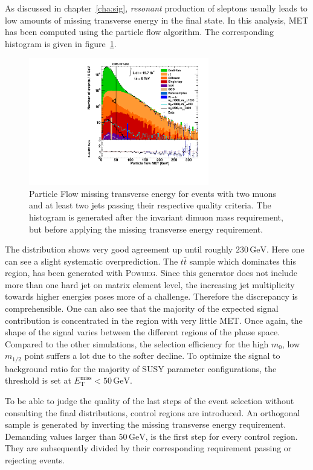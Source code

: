 As discussed in chapter~\ref{cha:sig}, \textit{resonant} production of sleptons usually leads to low amounts of missing transverse energy in the final state. In this analysis, MET has been computed using the particle flow algorithm. The corresponding histogram is given in figure~\ref{fig:pfmet}.

\begin{figure}[ht!]
  \centering
    \includegraphics[width=0.7\textwidth]{plots/apfmet.pdf}
  \caption{Particle Flow missing transverse energy for events with two muons and at least two jets passing their respective quality criteria. The histogram is generated after the invariant dimuon mass requirement, but before applying the missing transverse energy requirement.}
  \label{fig:pfmet}
\end{figure}

The distribution shows very good agreement up until roughly $230\,\text{GeV}$. Here one can see a slight systematic overprediction. The $t\bar{t}$ sample which dominates this region, has been generated with \textsc{Powheg}. Since this generator does not include more than one hard jet on matrix element level, the increasing jet multiplicity towards higher energies poses more of a challenge. Therefore the discrepancy is comprehensible. One can also see that the majority of the expected signal contribution is concentrated in the region with very little MET. Once again, the shape of the signal varies between the different regions of the phase space. Compared to the other simulations, the selection efficiency for the high $m_0$, low $m_{1/2}$ point suffers a lot due to the softer decline. To optimize the signal to background ratio for the majority of SUSY parameter configurations, the threshold is set at $E^{\text{miss}}_{\text{T}} < 50\,\text{GeV}$.

To be able to judge the quality of the last steps of the event selection without consulting the final distributions, control regions are introduced. An orthogonal sample is generated by inverting the missing transverse energy requirement. Demanding values larger than $50\,\text{GeV}$, is the first step for every control region. They are subsequently divided by their corresponding requirement passing or rejecting events.


